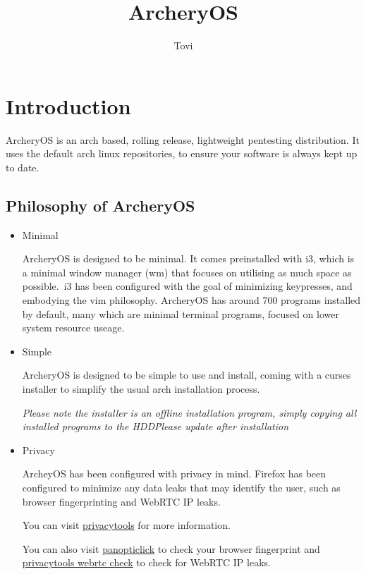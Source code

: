 \documentclass{article}
\author{Tovi}
\title{ArcheryOS}
\begin{document}
\maketitle

\tableofcontents

\pagebreak

\section{Introduction}
ArcheryOS is an arch based, rolling release, lightweight pentesting distribution. It uses the default arch linux repositories, to ensure your software is always kept up to date.
\subsection{Philosophy of ArcheryOS}
\begin{itemize}
	\item Minimal

		ArcheryOS is designed to be minimal. It comes preinstalled with i3, which is a minimal window manager (wm) that focuses on utilising as much space as possible.\ i3 has been configured with the goal of minimizing keypresses, and embodying the vim philosophy. ArcheryOS has around 700 programs installed by default, many which are minimal terminal programs, focused on lower system resource useage.

	\item Simple

		ArcheryOS is designed to be simple to use and install, coming with a curses installer to simplify the usual arch installation process.

		\emph{Please note the installer is an offline installation program, simply copying all installed programs to the HDD\. Please update after installation}
	
	\item Privacy

		ArcheyOS has been configured with privacy in mind. Firefox has been configured to minimize any data leaks that may identify the user, such as browser fingerprinting and WebRTC IP leaks. 
		
		You can visit \href{https://www.privacytools.io/}{privacytools} for more information.

		You can also visit \href{https://panopticlick.eff.org/}{panopticlick} to check your browser fingerprint and \href{https://www.privacytools.io/webrtc.html}{privacytools webrtc check} to check for WebRTC IP leaks.
\end{itemize}
\end{document}
